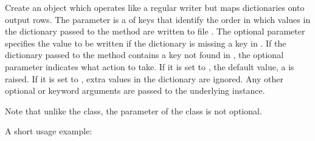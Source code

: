 \documentclass[letterpaper,10pt,english]{sphinxmanual}
\begin{document}
\begin{fulllineitems}
\label{\detokenize{csv:csv.DictWriter}}
Create an object which operates like a regular writer but maps dictionaries
onto output rows.  The  parameter is a  of keys that identify the order in which values in the
dictionary passed to the  method are written to file
.  The optional  parameter specifies the value to be
written if the dictionary is missing a key in .  If the
dictionary passed to the  method contains a key not found in
, the optional  parameter indicates what action to
take.
If it is set to , the default value, a 
is raised.
If it is set to , extra values in the dictionary are ignored.
Any other optional or keyword arguments are passed to the underlying
{\hyperref[\detokenize{csv:csv.writer}]{}} instance.

Note that unlike the {\hyperref[\detokenize{csv:csv.DictReader}]{}} class, the  parameter
of the {\hyperref[\detokenize{csv:csv.DictWriter}]{}} class is not optional.

A short usage example:

\begin{sphinxVerbatim}[commandchars=\\\{\}]
 


\end{sphinxVerbatim}
\end{fulllineitems}
\end{document}
